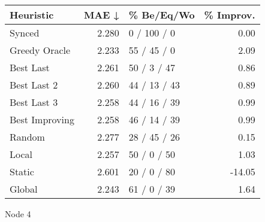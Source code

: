 \begin{tabular}{lrlr}
\toprule
\textbf{Heuristic} & \textbf{MAE ↓} & \textbf{\% Be/Eq/Wo} & \textbf{\% Improv.} \\
\midrule
            Synced &          2.280 &          0 / 100 / 0 &                0.00 \\
     Greedy Oracle &          2.233 &          55 / 45 / 0 &                2.09 \\
         Best Last &          2.261 &          50 / 3 / 47 &                0.86 \\
       Best Last 2 &          2.260 &         44 / 13 / 43 &                0.89 \\
       Best Last 3 &          2.258 &         44 / 16 / 39 &                0.99 \\
    Best Improving &          2.258 &         46 / 14 / 39 &                0.99 \\
            Random &          2.277 &         28 / 45 / 26 &                0.15 \\
             Local &          2.257 &          50 / 0 / 50 &                1.03 \\
            Static &          2.601 &          20 / 0 / 80 &              -14.05 \\
            Global &          2.243 &          61 / 0 / 39 &                1.64 \\
\bottomrule
\end{tabular}
\caption{Node 4}
\label{tab:hr_non_lr01_le1_bs4_4}
